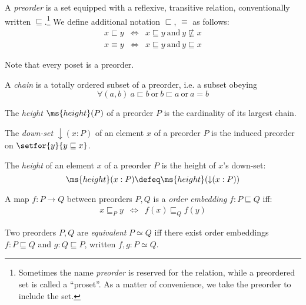 \documentclass{article}
\renewcommand{\land}{~\text{and}~}
\renewcommand{\lor}{~\text{or}~}
\newcommand{\ale}{\sqsubseteq}
\newcommand{\alt}{\sqsubset}
\newcommand{\aeq}{\equiv}
\newcommand{\ordle}{\ale}
\newcommand{\ordeq}{\simeq}
\newcommand{\eqposet}[1]{\ms{Eq}(#1)}
\renewcommand{\eqposet}[1]{\|{#1}\|}
\newcommand{\height}{\ms{height}}
\newcommand{\elemheight}[2]{\height(#2 : #1)}
\newcommand{\down}[2]{\mathop{\downarrow}(#2 : #1)}
\begin{document}
\begin{definition}
  A \emph{preorder} is a set equipped with a reflexive, transitive relation,
  conventionally written $\ale$.\footnote{Sometimes the name \emph{preorder} is
    reserved for the relation, while a preordered set is called a ``proset''. As
    a matter of convenience, we take the preorder to include the set.} We define
  additional notation $\alt$, $\aeq$ as follows:
  \begin{eqnarray*}
    x \alt y &\iff& x \ale y \land y \not\ale x\\
    x \aeq y &\iff& x \ale y \land y \ale x
  \end{eqnarray*}

  Note that every poset is a preorder.
\end{definition}

\begin{definition}
  A \emph{chain} is a totally ordered subset of a preorder, i.e. a subset
  obeying \[\forall(a, b)\ a \alt b \lor b \alt a \lor a = b \]
\end{definition}

\begin{definition}
  The \emph{height} $\height(P)$ of a preorder $P$ is the cardinality of its largest chain.
\end{definition}


\begin{definition}
  The \emph{down-set} $\down{P}{x}$ of an element $x$ of a preorder $P$ is the
  induced preorder on $\setfor{y}{y \ale x}$.
\end{definition}

\begin{definition}
  The \emph{height} of an element $x$ of a preorder $P$ is the height of $x$'s
  down-set: \[\elemheight{P}{x} \defeq \height(\down{P}{x})\]
\end{definition}

\begin{definition}\label{def:ordinj}
  A map $f : P \to Q$ between preorders $P,Q$ is a \emph{order embedding} $f
  : P \ordle Q$ iff:
  \begin{eqnarray*}
    x \ale_P y &\iff& f(x) \ale_Q f(y)
  \end{eqnarray*}
\end{definition}

\begin{definition}\label{def:ordeq}
  Two preorders $P,Q$ are \emph{equivalent} $P \ordeq Q$ iff there exist
  order embeddings $f : P \ordle Q$ and $g : Q \ordle P$, written $f,g : P
  \ordeq Q$.
\end{definition}
\end{document}
